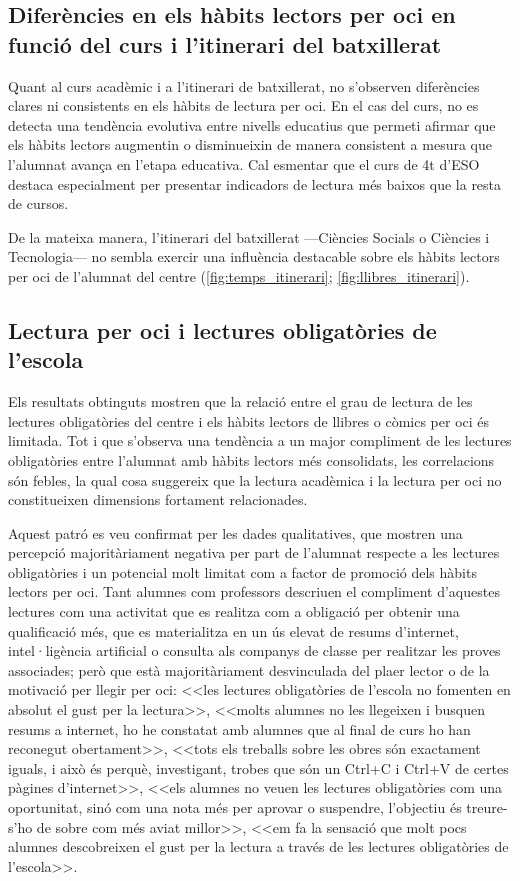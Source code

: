 \documentclass[12pt]{article}
\begin{document}
\subsection{Diferències en els hàbits lectors per oci en funció del curs i l'itinerari del batxillerat}
Quant al curs acadèmic i a l’itinerari de batxillerat, no s’observen diferències clares ni consistents en els hàbits de lectura per oci. En el cas del curs, no es detecta una tendència evolutiva entre nivells educatius que permeti afirmar que els hàbits lectors augmentin o disminueixin de manera consistent a mesura que l’alumnat avança en l’etapa educativa. Cal esmentar que el curs de 4t d'ESO destaca especialment per presentar indicadors de lectura més baixos que la resta de cursos. 

De la mateixa manera, l'itinerari del batxillerat ---Ciències Socials o Ciències i Tecnologia--- no sembla exercir una influència destacable sobre els hàbits lectors per oci de l’alumnat del centre (\autoref{fig:temps_itinerari}; \autoref{fig:llibres_itinerari}).

\subsection{Lectura per oci i lectures obligatòries de l'escola}
Els resultats obtinguts mostren que la relació entre el grau de lectura de les lectures obligatòries del centre i els hàbits lectors de llibres o còmics per oci és limitada. Tot i que s’observa una tendència a un major compliment de les lectures obligatòries entre l’alumnat amb hàbits lectors més consolidats, les correlacions són febles, la qual cosa suggereix que la lectura acadèmica i la lectura per oci no constitueixen dimensions fortament relacionades.

Aquest patró es veu confirmat per les dades qualitatives, que mostren una percepció majoritàriament negativa per part de l'alumnat respecte a les lectures obligatòries i un potencial molt limitat com a factor de promoció dels hàbits lectors per oci. Tant alumnes com professors descriuen el compliment d'aquestes lectures com una activitat que es realitza com a obligació per obtenir una qualificació més, que es materialitza en un ús elevat de resums d'internet, intel·ligència artificial o consulta als companys de classe per realitzar les proves associades; però que està majoritàriament desvinculada del plaer lector o de la motivació per llegir per oci: <<les lectures obligatòries de l’escola no fomenten en absolut el gust per la lectura>>, <<molts alumnes no les llegeixen i busquen resums a internet, ho he constatat amb alumnes que al final de curs ho han reconegut obertament>>, <<tots els treballs sobre les obres són exactament iguals, i això és perquè, investigant, trobes que són un Ctrl+C i Ctrl+V de certes pàgines d'internet>>, <<els alumnes no veuen les lectures obligatòries com una oportunitat, sinó com una nota més per aprovar o suspendre, l'objectiu és treure-s'ho de sobre com més aviat millor>>, <<em fa la sensació que molt pocs alumnes descobreixen el gust per la lectura a través de les lectures obligatòries de l'escola>>.
\end{document}
